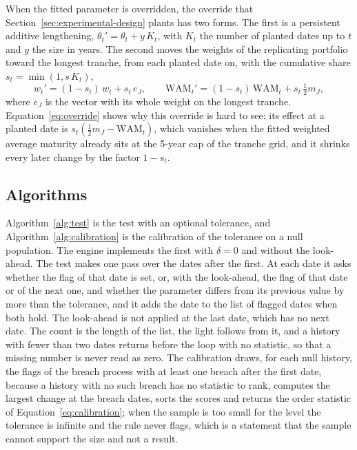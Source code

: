 When the fitted parameter is overridden, the override that Section~\ref{sec:experimental-design} plants has two forms. The first is a persistent additive lengthening, $\theta_t'=\theta_t+y\,K_t$, with $K_t$ the number of planted dates up to $t$ and $y$ the size in years. The second moves the weights of the replicating portfolio toward the longest tranche, from each planted date on, with the cumulative share $s_t=\min(1,s\,K_t)$,
\begin{equation}
w_t'=(1-s_t)\,w_t+s_t\,e_J,\qquad \mathrm{WAM}_t'=(1-s_t)\,\mathrm{WAM}_t+s_t\,\tfrac12 m_J,
\label{eq:override}
\end{equation}
where $e_J$ is the vector with its whole weight on the longest tranche. Equation~\eqref{eq:override} shows why this override is hard to see: its effect at a planted date is $s_t(\tfrac12 m_J-\mathrm{WAM}_t)$, which vanishes when the fitted weighted average maturity already sits at the 5-year cap of the tranche grid, and it shrinks every later change by the factor $1-s_t$.

\subsection{Algorithms}
\label{sec:method-algorithms}

Algorithm~\ref{alg:test} is the test with an optional tolerance, and Algorithm~\ref{alg:calibration} is the calibration of the tolerance on a null population. The engine implements the first with $\delta=0$ and without the look-ahead. The test makes one pass over the dates after the first. At each date it asks whether the flag of that date is set, or, with the look-ahead, the flag of that date or of the next one, and whether the parameter differs from its previous value by more than the tolerance, and it adds the date to the list of flagged dates when both hold. The look-ahead is not applied at the last date, which has no next date. The count is the length of the list, the light follows from it, and a history with fewer than two dates returns before the loop with no statistic, so that a missing number is never read as zero. The calibration draws, for each null history, the flags of the breach process with at least one breach after the first date, because a history with no such breach has no statistic to rank, computes the largest change at the breach dates, sorts the scores and returns the order statistic of Equation~\eqref{eq:calibration}; when the sample is too small for the level the tolerance is infinite and the rule never flags, which is a statement that the sample cannot support the size and not a result.

